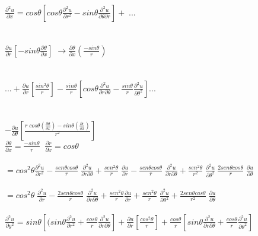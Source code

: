 \documentclass[10pt,a4paper]{report}
\begin{document}
\ \\ $\displaystyle \frac{\partial ^2 u}{\partial x} = cos \theta \left[cos \theta \frac{\partial ^2 u}{\partial r^2} - sin \theta \frac{\partial ^2 u}{\partial \theta \partial r}\right] + \; ... $
\\\\
\ \\ $\displaystyle \frac{\partial u}{\partial r} \left[- sin \theta \frac{\partial \theta}{\partial x} \right] \;\rightarrow \frac{\partial \theta}{\partial x} 
 \left(\frac{-sin \theta}{r} \right)$
\\\\
\ \\ $\displaystyle ... + \frac{\partial u}{\partial r} \left[\frac{sin ^2 \theta}{r}  \right] - \frac{sin \theta}{r} \left[ cos \theta \frac{\partial^2 u}{\partial r \partial \theta} - \frac{sin \theta}{r} \frac{\partial^2 u}{\partial \theta^2} \right]... $ 
\\\\
\ \\ $\displaystyle - \frac{\partial u}{\partial \theta} \left[ \frac{ r \; cos \theta \left(\frac{\partial \theta}{\partial x} \right) - sin \theta \left(\frac{\partial r}{\partial x} \right) }{r^2} \right]$
\ \\ $\displaystyle \frac{\partial \theta}{\partial x} = \frac{- sin \theta}{r} \; \; \frac{\partial r}{\partial x} = cos \theta$
\\
\ \\ $\displaystyle
= cos^2 \theta \frac{\partial^2 u}{\partial r^2} - \frac{sen \theta cos \theta}{r} \; \frac{\partial^2 u}{\partial r \partial \theta} + \frac{sen^2 \theta}{r} \; \frac{\partial u}{\partial r} - \frac{sen \theta cos \theta}{r} \; \frac{\partial^2 u}{\partial r \partial \theta} + \frac{sen^2 \theta}{r^2} \; \frac{\partial^2 u}{\partial \theta^2} \: \frac{2 sen \theta cos \theta}{r} \; \frac{\partial u}{\partial \theta}$
\\
\ \\ $\displaystyle
= cos^2 \theta \; \frac{\partial^2 u}{\partial r} - \frac{2 sen \theta cos \theta}{r} \; \frac{\partial^2 u}{\partial r \partial \theta} + \frac{sen^2 \theta}{r} \frac{\partial u}{\partial r} + \frac{sen^2 \theta}{r} \; \frac{\partial^2 u}{\partial \theta^2} + \frac{2 sen \theta cos \theta}{r^2}  \; \frac{\partial u}{\partial \theta}$
\\
\ \\ $\displaystyle
\frac{\partial^2 u}{\partial y^2} = sin \theta \left[( sin \theta \frac{\partial^2 u}{\partial r^2} + \frac{cos \theta}{r} \frac{\partial^2 u}{\partial r \partial \theta}\right] + \frac{\partial u}{\partial r} \left[\frac{cos^2 \theta}{r}\right ] + \frac{cos \theta}{r} \left [ sin \theta \frac{\partial^2 u}{\partial r \partial \theta} + \frac{cos\theta}{r} \frac{\partial^2 u}{\partial \theta^2}\right]$
\end{document}
